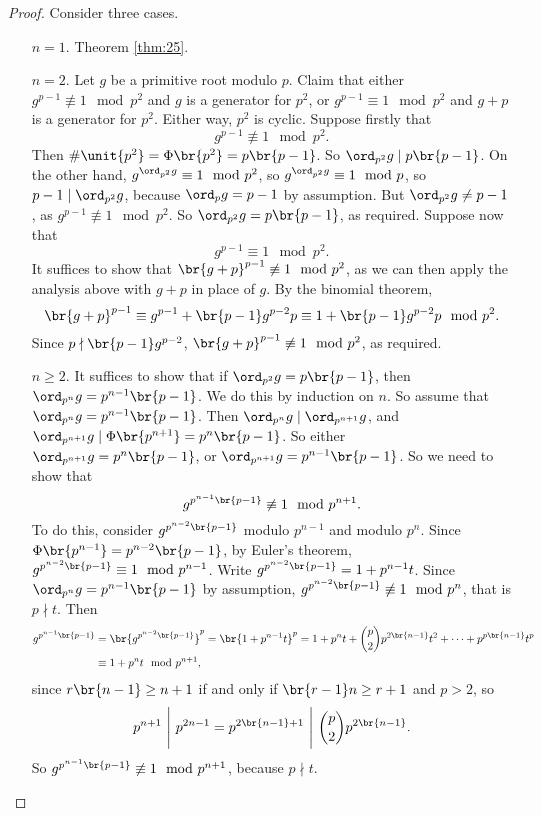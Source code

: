 \begin{proof}
Consider three cases.
\begin{itemize}[leftmargin=0.5in]
\item[$ n = 1 $.] Theorem \ref{thm:25}.
\item[$ n = 2 $.] Let $ g $ be a primitive root modulo $ p $. Claim that either $ g^{p - 1} \not\equiv 1 \mod p^2 $ and $ g $ is a generator for $ \unit{p^2} $, or $ g^{p - 1} \equiv 1 \mod p^2 $ and $ g + p $ is a generator for $ \unit{p^2} $. Either way, $ \unit{p^2} $ is cyclic. Suppose firstly that
$$ g^{p - 1} \not\equiv 1 \mod p^2. $$
Then $ \#\unit{p^2} = \Phi\br{p^2} = p\br{p - 1} $. So $ \ord_{p^2} g \mid p\br{p - 1} $. On the other hand, $ g^{\ord_{p^2} g} \equiv 1 \mod p^2 $, so $ g^{\ord_{p^2} g} \equiv 1 \mod p $, so $ p - 1 \mid \ord_{p^2} g $, because $ \ord_p g = p - 1 $ by assumption. But $ \ord_{p^2} g \ne p - 1 $, as $ g^{p - 1} \not\equiv 1 \mod p^2 $. So $ \ord_{p^2} g = p\br{p - 1} $, as required. Suppose now that
$$ g^{p - 1} \equiv 1 \mod p^2. $$
It suffices to show that $ \br{g + p}^{p - 1} \not\equiv 1 \mod p^2 $, as we can then apply the analysis above with $ g + p $ in place of $ g $. By the binomial theorem,
$$ \br{g + p}^{p - 1} \equiv g^{p - 1} + \br{p - 1}g^{p - 2}p \equiv 1 + \br{p - 1}g^{p - 2}p \mod p^2. $$
Since $ p \nmid \br{p - 1}g^{p - 2} $, $ \br{g + p}^{p - 1} \not\equiv 1 \mod p^2 $, as required.
\item[$ n \ge 2 $.] It suffices to show that if $ \ord_{p^2} g = p\br{p - 1} $, then $ \ord_{p^n} g = p^{n - 1}\br{p - 1} $. We do this by induction on $ n $. So assume that $ \ord_{p^n} g = p^{n - 1}\br{p - 1} $. Then $ \ord_{p^n} g \mid \ord_{p^{n + 1}} g $, and $ \ord_{p^{n + 1}} g \mid \Phi\br{p^{n + 1}} = p^n\br{p - 1} $. So either $ \ord_{p^{n + 1}} g = p^n\br{p - 1} $, or $ \ord_{p^{n + 1}} g = p^{n - 1}\br{p - 1} $. So we need to show that
$$ g^{p^{n - 1}\br{p - 1}} \not\equiv 1 \mod p^{n + 1}. $$
To do this, consider $ g^{p^{n - 2}\br{p - 1}} $ modulo $ p^{n - 1} $ and modulo $ p^n $. Since $ \Phi\br{p^{n - 1}} = p^{n - 2}\br{p - 1} $, by Euler's theorem, $ g^{p^{n - 2}\br{p - 1}} \equiv 1 \mod p^{n - 1} $. Write $ g^{p^{n - 2}\br{p - 1}} = 1 + p^{n - 1}t $. Since $ \ord_{p^n} g = p^{n - 1}\br{p - 1} $ by assumption, $ g^{p^{n - 2}\br{p - 1}} \not\equiv 1 \mod p^n $, that is $ p \nmid t $. Then
\begin{align*}
g^{p^{n - 1}\br{p - 1}}
& = \br{g^{p^{n - 2}\br{p - 1}}}^p
= \br{1 + p^{n - 1}t}^p
= 1 + p^nt + \binom{p}{2}p^{2\br{n - 1}}t^2 + \dots + p^{p\br{n - 1}}t^p \\
& \equiv 1 + p^nt \mod p^{n + 1},
\end{align*}
since $ r\br{n - 1} \ge n + 1 $ if and only if $ \br{r - 1}n \ge r + 1 $ and $ p > 2 $, so
$$ p^{n + 1} \ \Bigg| \ p^{2n - 1} = p^{2\br{n - 1} + 1} \ \Bigg| \ \binom{p}{2}p^{2\br{n - 1}}. $$
So $ g^{p^{n - 1}\br{p - 1}} \not\equiv 1 \mod p^{n + 1} $, because $ p \nmid t $.
\end{itemize}
\end{proof}

